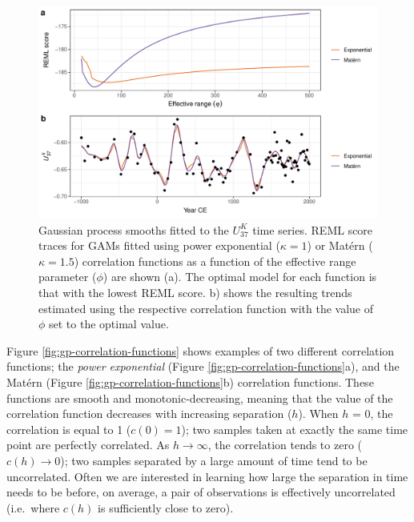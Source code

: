 \documentclass[12pt,]{article}
\newcommand{\uk}{\ensuremath{\mathit{U}^{\mathit{K}}_{\mathup{37}}}}
\begin{document}
\begin{figure}

{\centering \includegraphics[width=0.8\linewidth]{manuscript_files/figure-latex/gp-gam-detail-plot-1} 

}

\caption{Gaussian process smooths fitted to the \uk{} time series. REML score traces for GAMs fitted using power exponential ($\kappa = 1$) or Matérn ($\kappa = 1.5$) correlation functions as a function of the effective range parameter ($\phi$) are shown (a). The optimal model for each function is that with the lowest REML score. b) shows the resulting trends estimated using the respective correlation function with the value of $\phi$ set to the optimal value.}\label{fig:gp-gam-detail-plot}
\end{figure}

Figure \ref{fig:gp-correlation-functions} shows examples of two
different correlation functions; the \emph{power exponential} (Figure
\ref{fig:gp-correlation-functions}a), and the Matérn (Figure
\ref{fig:gp-correlation-functions}b) correlation functions. These
functions are smooth and monotonic-decreasing, meaning that the value of
the correlation function decreases with increasing separation (\(h\)).
When \(h\) = 0, the correlation is equal to 1 (\(c(0) = 1\)); two
samples taken at exactly the same time point are perfectly correlated.
As \(h \rightarrow \infty\), the correlation tends to zero
(\(c(h) \rightarrow 0\)); two samples separated by a large amount of
time tend to be uncorrelated. Often we are interested in learning how
large the separation in time needs to be before, on average, a pair of
observations is effectively uncorrelated (i.e.~where \(c(h)\) is
sufficiently close to zero).
\end{document}
